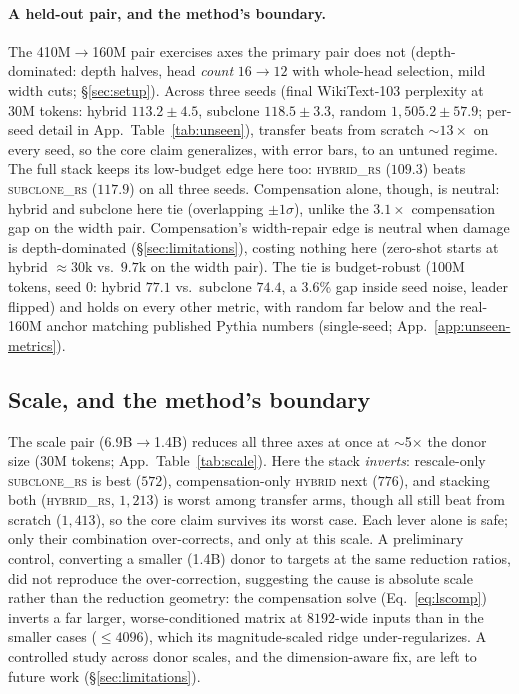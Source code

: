 \paragraph{A held-out pair, and the method's boundary.}
The 410M$\to$160M pair exercises axes the primary pair does not (depth-dominated:
depth halves, head \emph{count} $16\to12$ with whole-head selection, mild width
cuts; \S\ref{sec:setup}). Across three seeds (final WikiText-103 perplexity at
30M tokens: hybrid $113.2\pm4.5$, subclone $118.5\pm3.3$, random
$1{,}505.2\pm57.9$; per-seed detail in App.~Table~\ref{tab:unseen}), transfer
beats from scratch $\sim$$13\times$ on every seed, so the core claim generalizes,
with error bars, to an untuned regime. The full stack keeps its low-budget edge
here too: \textsc{hybrid\_rs} ($109.3$) beats \textsc{subclone\_rs} ($117.9$) on
all three seeds. Compensation alone, though, is neutral: hybrid and
subclone here tie
(overlapping $\pm1\sigma$), unlike the $3.1\times$ compensation gap on the width
pair. Compensation's width-repair edge is neutral when damage is
depth-dominated (\S\ref{sec:limitations}), costing nothing here (zero-shot starts
at hybrid $\approx$30k vs.\ $9.7$k on the width pair). The tie is budget-robust
(100M tokens, seed 0: hybrid $77.1$ vs.\ subclone $74.4$, a 3.6\% gap inside seed
noise, leader flipped) and holds on every other metric, with random far below and
the real-160M anchor matching published Pythia numbers (single-seed;
App.~\ref{app:unseen-metrics}).

\subsection{Scale, and the method's boundary}
\label{sec:race:scale}

The scale pair (6.9B$\to$1.4B) reduces all three axes at once at $\sim$5$\times$
the donor size (30M tokens; App.~Table~\ref{tab:scale}). Here the stack
\emph{inverts}: rescale-only \textsc{subclone\_rs} is best ($572$),
compensation-only \textsc{hybrid} next ($776$), and stacking both
(\textsc{hybrid\_rs}, $1{,}213$) is worst among transfer arms, though all still
beat from scratch ($1{,}413$), so the core claim survives its worst case. Each
lever alone is safe; only their combination over-corrects, and only at this scale.
A preliminary control, converting a smaller (1.4B) donor to targets at
the same reduction ratios, did not reproduce the over-correction,
suggesting the cause is absolute scale rather than the reduction geometry:
the compensation solve (Eq.~\ref{eq:lscomp}) inverts a far larger,
worse-conditioned matrix at $8192$-wide inputs than in the smaller cases
($\le4096$), which its magnitude-scaled ridge under-regularizes. A controlled
study across donor scales, and the dimension-aware fix, are left to future work
(\S\ref{sec:limitations}).

